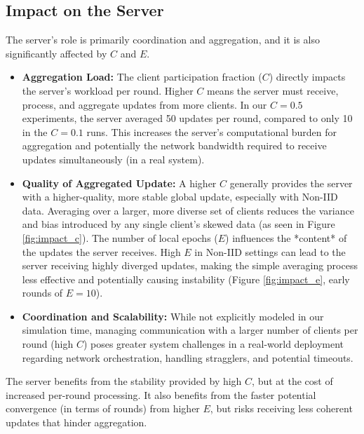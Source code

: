 \documentclass[conference]{IEEEtran}
\begin{document}
\subsection{Impact on the Server}
The server's role is primarily coordination and aggregation, and it is also significantly affected by $C$ and $E$.
\begin{itemize}
    \item \textbf{Aggregation Load:} The client participation fraction ($C$) directly impacts the server's workload per round. Higher $C$ means the server must receive, process, and aggregate updates from more clients. In our $C=0.5$ experiments, the server averaged 50 updates per round, compared to only 10 in the $C=0.1$ runs. This increases the server's computational burden for aggregation and potentially the network bandwidth required to receive updates simultaneously (in a real system).
    \item \textbf{Quality of Aggregated Update:} A higher $C$ generally provides the server with a higher-quality, more stable global update, especially with Non-IID data. Averaging over a larger, more diverse set of clients reduces the variance and bias introduced by any single client's skewed data (as seen in Figure \ref{fig:impact_c}). The number of local epochs ($E$) influences the *content* of the updates the server receives. High $E$ in Non-IID settings can lead to the server receiving highly diverged updates, making the simple averaging process less effective and potentially causing instability (Figure \ref{fig:impact_e}, early rounds of $E=10$).
    \item \textbf{Coordination and Scalability:} While not explicitly modeled in our simulation time, managing communication with a larger number of clients per round (high $C$) poses greater system challenges in a real-world deployment regarding network orchestration, handling stragglers, and potential timeouts.
\end{itemize}
The server benefits from the stability provided by high $C$, but at the cost of increased per-round processing. It also benefits from the faster potential convergence (in terms of rounds) from higher $E$, but risks receiving less coherent updates that hinder aggregation.
\end{document}
